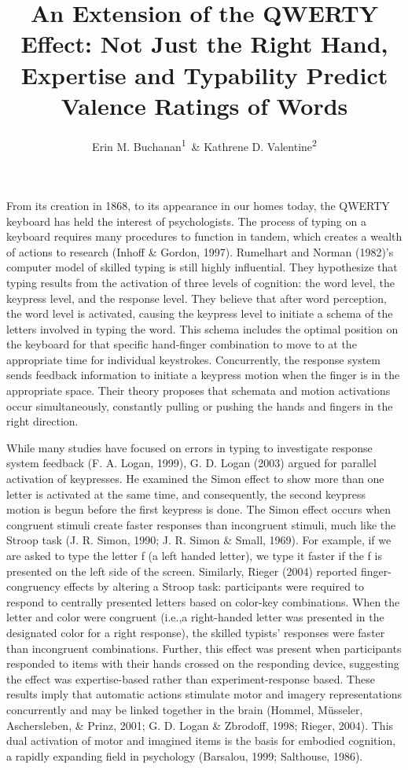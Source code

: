 \documentclass[english,man]{apa6}
\title{An Extension of the QWERTY Effect: Not Just the Right Hand, Expertise
and Typability Predict Valence Ratings of Words}
\author{Erin M. Buchanan\textsuperscript{1}~\& Kathrene D. Valentine\textsuperscript{2}}
\affiliation{
    \vspace{0.5cm}
          \textsuperscript{1} Missouri State University\\
          \textsuperscript{2} University of Missouri  }
\theoremstyle{definition}
\theoremstyle{definition}
\theoremstyle{definition}
\theoremstyle{remark}
\begin{document}
\maketitle

\setcounter{secnumdepth}{0}



From its creation in 1868, to its appearance in our homes today, the
QWERTY keyboard has held the interest of psychologists. The process of
typing on a keyboard requires many procedures to function in tandem,
which creates a wealth of actions to research (Inhoff \& Gordon, 1997).
Rumelhart and Norman (1982)'s computer model of skilled typing is still
highly influential. They hypothesize that typing results from the
activation of three levels of cognition: the word level, the keypress
level, and the response level. They believe that after word perception,
the word level is activated, causing the keypress level to initiate a
schema of the letters involved in typing the word. This schema includes
the optimal position on the keyboard for that specific hand-finger
combination to move to at the appropriate time for individual
keystrokes. Concurrently, the response system sends feedback information
to initiate a keypress motion when the finger is in the appropriate
space. Their theory proposes that schemata and motion activations occur
simultaneously, constantly pulling or pushing the hands and fingers in
the right direction.

While many studies have focused on errors in typing to investigate
response system feedback (F. A. Logan, 1999), G. D. Logan (2003) argued
for parallel activation of keypresses. He examined the Simon effect to
show more than one letter is activated at the same time, and
consequently, the second keypress motion is begun before the first
keypress is done. The Simon effect occurs when congruent stimuli create
faster responses than incongruent stimuli, much like the Stroop task (J.
R. Simon, 1990; J. R. Simon \& Small, 1969). For example, if we are
asked to type the letter f (a left handed letter), we type it faster if
the f is presented on the left side of the screen. Similarly, Rieger
(2004) reported finger-congruency effects by altering a Stroop task:
participants were required to respond to centrally presented letters
based on color-key combinations. When the letter and color were
congruent (i.e.,a right-handed letter was presented in the designated
color for a right response), the skilled typists' responses were faster
than incongruent combinations. Further, this effect was present when
participants responded to items with their hands crossed on the
responding device, suggesting the effect was expertise-based rather than
experiment-response based. These results imply that automatic actions
stimulate motor and imagery representations concurrently and may be
linked together in the brain (Hommel, Müsseler, Aschersleben, \& Prinz,
2001; G. D. Logan \& Zbrodoff, 1998; Rieger, 2004). This dual activation
of motor and imagined items is the basis for embodied cognition, a
rapidly expanding field in psychology (Barsalou, 1999; Salthouse, 1986).
\end{document}
